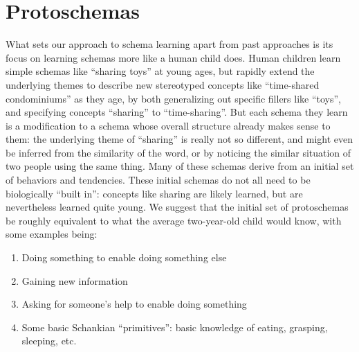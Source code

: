 \section{Protoschemas}
\label{sec:protoschemas}
What sets our approach to schema learning apart from past approaches is its focus on learning schemas more like a human child does. Human children learn simple schemas like ``sharing toys'' at young ages, but rapidly extend the underlying themes to describe new stereotyped concepts like ``time-shared condominiums'' as they age, by both generalizing out specific fillers like ``toys'', and specifying concepts ``sharing'' to ``time-sharing''. But each schema they learn is a modification to a schema whose overall structure already makes sense to them: the underlying theme of ``sharing'' is really not so different, and might even be inferred from the similarity of the word, or by noticing the similar situation of two people using the same thing. Many of these schemas derive from an initial set of behaviors and tendencies. These initial schemas do not all need to be biologically ``built in'': concepts like sharing are likely learned, but are nevertheless learned quite young. We suggest that the initial set of protoschemas be roughly equivalent to what the average two-year-old child would know, with some examples being:

\begin{enumerate}
    \item Doing something to enable doing something else
    \item Gaining new information
    \item Asking for someone's help to enable doing something
    \item Some basic Schankian ``primitives'': basic knowledge of eating, grasping, sleeping, etc.
\end{enumerate}

